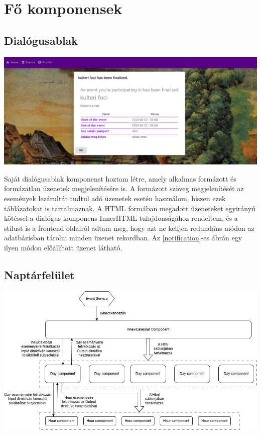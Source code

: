 \documentclass[a4paper,12pt]{report}
\theoremstyle{definition}
\theoremstyle{remark}
\begin{document}
\section{Fő komponensek}

	\subsection{Dialógusablak}

\begin{center}
\includegraphics[width=150mm]{notification}
\captionsetup{width=0.8\linewidth}
\label{notification}
\end{center}

Saját dialógusablak komponenst hoztam létre, amely alkalmas formázott és formázatlan üzenetek megjelenítésére is. A formázott szöveg megjelenítését az események lezárultát tudtul adó üzenetek esetén használom, hiszen ezek táblázatokat is tartalmaznak.  A HTML formában megadott üzeneteket egyirányú kötéssel a dialógus komponens InnerHTML tulajdonságához rendeltem, és a stílust is a frontend oldalról adtam meg, hogy azt ne kelljen redundáns módon az adatbázisban tárolni minden üzenet rekordban. Az \ref{notification}-es ábrán egy ilyen módon előállított üzenet látható.

	\subsection{Naptárfelület}

\begin{center}
\includegraphics[width=150mm]{view_calendar_structure}
\captionsetup{width=0.8\linewidth}
\label{view_calendar_structure}
\end{center}
\end{document}
